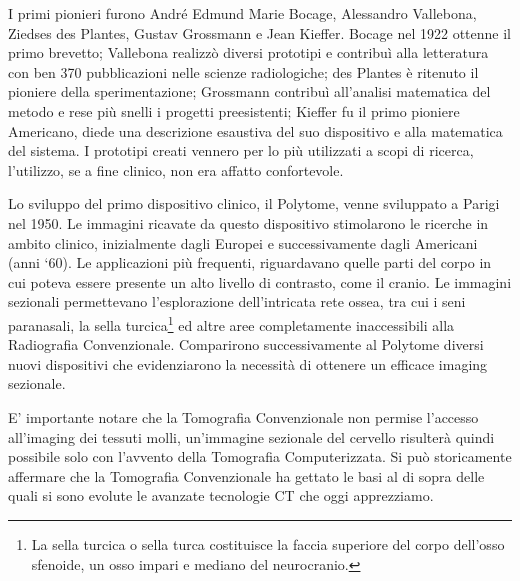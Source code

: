 \documentclass[a4paper,12pt, doubleside]{report}
\begin{document}
                \bigskip
                \par
                    I primi pionieri furono André Edmund Marie Bocage, Alessandro Vallebona, Ziedses des Plantes, Gustav Grossmann e Jean Kieffer. Bocage nel 1922 ottenne il primo brevetto; Vallebona realizzò diversi prototipi e contribuì alla letteratura con ben 370 pubblicazioni nelle scienze radiologiche\cite{vallebona-ricordo}; des Plantes è ritenuto il pioniere della sperimentazione; Grossmann contribuì all’analisi matematica del metodo e rese più snelli i progetti preesistenti; Kieffer fu il primo pioniere Americano, diede una descrizione esaustiva del suo dispositivo e alla matematica del sistema. I prototipi creati vennero per lo più utilizzati a scopi di ricerca, l'utilizzo, se a fine clinico, non era affatto confortevole.
                
                \bigskip
                \par
                    Lo sviluppo del primo dispositivo clinico, il Polytome, venne sviluppato a Parigi nel 1950. Le immagini ricavate da questo dispositivo stimolarono le ricerche in ambito clinico, inizialmente dagli Europei e successivamente dagli Americani (anni ‘60).
                    Le applicazioni più frequenti, riguardavano quelle parti del corpo in cui poteva essere presente un alto livello di contrasto, come il cranio. Le immagini sezionali permettevano l’esplorazione dell’intricata rete ossea, tra cui i seni paranasali, la sella turcica\footnote{La sella turcica o sella turca costituisce la faccia superiore del corpo dell'osso sfenoide, un osso impari e mediano del neurocranio.} ed altre aree completamente inaccessibili alla Radiografia Convenzionale. Comparirono successivamente al Polytome diversi nuovi dispositivi che evidenziarono la necessità di ottenere un efficace imaging sezionale.
                
                \bigskip
                \par
                    E’ importante notare che la Tomografia Convenzionale non permise l’accesso all’imaging dei tessuti molli, un’immagine sezionale del cervello risulterà quindi possibile solo con l’avvento della Tomografia Computerizzata. Si può storicamente affermare che la Tomografia Convenzionale ha gettato le basi al di sopra delle quali si sono evolute le avanzate tecnologie CT che oggi apprezziamo.
                        
\end{document}
